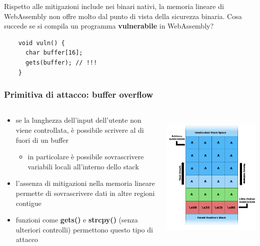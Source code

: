 \documentclass{beamer}
\begin{document}
\begin{frame}[fragile]
  Rispetto alle mitigazioni include nei binari nativi, la memoria lineare di
  WebAssembly non offre molto dal punto di vista della sicurezza binaria.
\newline\newline
  Cosa succede se si compila un programma \textbf{vulnerabile} in WebAssembly?
\newline\newline
  \begin{verbatim}
    void vuln() {
      char buffer[16];
      gets(buffer); // !!!
    }
  \end{verbatim}
\end{frame}

\begin{frame}
  \frametitle{Primitiva di attacco: buffer overflow}
  \begin{columns}
    \begin{column}{0.6\textwidth}
      \begin{itemize}
        \item se la lunghezza dell'input dell'utente non viene controllata,
          è possibile scrivere al di fuori di un buffer
        \begin{itemize}
          \item in particolare è possibile sovrascrivere variabili locali
            all'interno dello stack
        \end{itemize}
        \item l'assenza di mitigazioni nella memoria lineare permette di sovrascrivere dati in altre regioni contigue
        \item funzioni come \textbf{gets()} e \textbf{strcpy()} (senza ulteriori controlli)
          permettono questo tipo di attacco  
      \end{itemize} 
    \end{column}
    \begin{column}{0.4\textwidth}
      \centerline{\includegraphics[width=10cm,height=6.5cm,keepaspectratio]{images/stack.png}}
    \end{column}
  \end{columns}
\end{frame}
\end{document}
